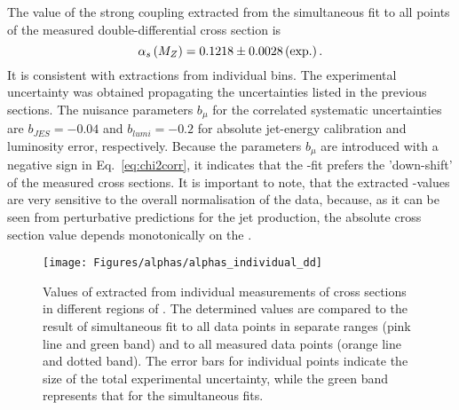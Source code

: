 The value of the strong coupling extracted from the simultaneous fit to all points of the measured double-differential cross section is
\begin{equation}
 \asz = 0.1218 \pm 0.0028 \left( \text{exp.} \right). %
 \label{eq:asdoubledifval}
\end{equation}
It is consistent with extractions from individual \qsq bins. The experimental uncertainty was obtained propagating the uncertainties listed in the previous sections. The nuisance parameters $b_{\mu}$ for the correlated systematic uncertainties are $b_{JES}=-0.04$ and $b_{lumi}=-0.2$ for absolute jet-energy calibration and luminosity error, respectively. Because the parameters $b_{\mu}$ are introduced with a negative sign in Eq.~\eqref{eq:chi2corr}, it indicates that the \as-fit prefers the 'down-shift' of the measured cross sections. It is important to note, that the extracted \as-values are very sensitive to the overall normalisation of the data, because, as it can be seen from perturbative predictions for the jet production, the absolute cross section value depends monotonically on the \asz.

\begin{figure}
 \centering
 \texttt{[image: Figures/alphas/alphas\_individual\_dd]}
 \caption{Values of \asz extracted from individual measurements of \dsdetjetb cross sections in different regions of \qsq. The determined values are compared to the result of simultaneous fit to all data points in separate \qsq ranges (pink line and green band) and to all measured data points (orange line and dotted band). The error bars for individual points indicate the size of the total experimental uncertainty, while the green band represents that for the simultaneous fits.}
 \label{fig:asindividual_dd}
\end{figure}

% 
